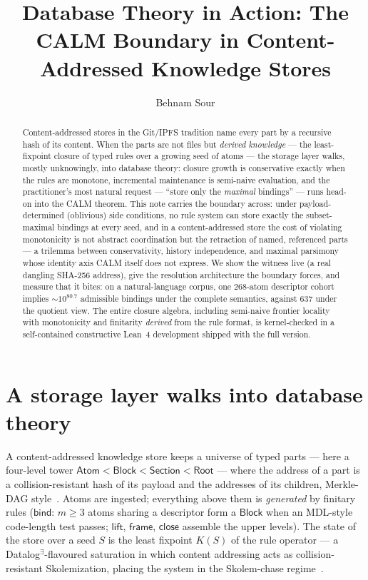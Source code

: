 \documentclass[a4paper,UKenglish,cleveref,autoref,thm-restate]{lipics-v2021}
\title{Database Theory in Action: The CALM Boundary in Content-Addressed Knowledge Stores}
\author{Behnam Sour}{Bone and Joint Reconstruction Research Center, Iran University of Medical Sciences, Tehran, Iran}{sourbehnam1374@gmail.com}{https://orcid.org/0009-0002-3176-1956}{}
\begin{document}
\maketitle

\begin{abstract}
Content-addressed stores in the Git/IPFS tradition name every part by a recursive hash of its content. When the parts are not files but \emph{derived knowledge} --- the least-fixpoint closure of typed rules over a growing seed of atoms --- the storage layer walks, mostly unknowingly, into database theory: closure growth is conservative exactly when the rules are monotone, incremental maintenance is semi-naive evaluation, and the practitioner's most natural request --- ``store only the \emph{maximal} bindings'' --- runs head-on into the CALM theorem. This note carries the boundary across: under payload-determined (oblivious) side conditions, no rule system can store exactly the subset-maximal bindings at every seed, and in a content-addressed store the cost of violating monotonicity is not abstract coordination but the retraction of named, referenced parts --- a trilemma between conservativity, history independence, and maximal parsimony whose identity axis CALM itself does not express. We show the witness live (a real dangling SHA-256 address), give the resolution architecture the boundary forces, and measure that it bites: on a natural-language corpus, one 268-atom descriptor cohort implies ${\sim}10^{80.7}$ admissible bindings under the complete semantics, against 637 under the quotient view. The entire closure algebra, including semi-naive frontier locality with monotonicity and finitarity \emph{derived} from the rule format, is kernel-checked in a self-contained constructive Lean~4 development shipped with the full version.
\end{abstract}

\section{A storage layer walks into database theory}

A content-addressed knowledge store keeps a universe of typed parts --- here a four-level tower $\mathsf{Atom} < \mathsf{Block} < \mathsf{Section} < \mathsf{Root}$ --- where the address of a part is a collision-resistant hash of its payload and the addresses of its children, Merkle-DAG style~\cite{Merkle87,Sanjuan20}. Atoms are ingested; everything above them is \emph{generated} by finitary rules ($\mathsf{bind}$: $m \ge 3$ atoms sharing a descriptor form a $\mathsf{Block}$ when an MDL-style code-length test passes; $\mathsf{lift}$, $\mathsf{frame}$, $\mathsf{close}$ assemble the upper levels). The state of the store over a seed $S$ is the least fixpoint $K(S)$ of the rule operator --- a Datalog$^{\exists}$-flavoured saturation in which content addressing acts as collision-resistant Skolemization, placing the system in the Skolem-chase regime~\cite{FaginKMP05,Marnette09}.
\end{document}
